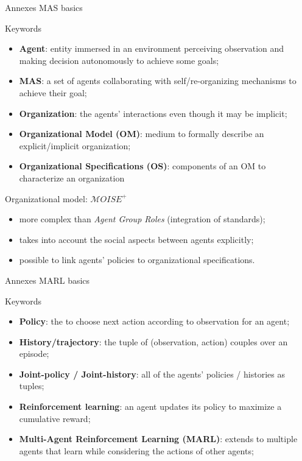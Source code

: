 \begin{frame}{Annexes}
    {MAS basics}

    \begin{block}{Keywords}
        \begin{itemize}
            \item \textbf{Agent}: entity immersed in an environment perceiving observation and making decision autonomously to achieve some goals;
            \item \textbf{MAS}: a set of agents collaborating with self/re-organizing mechanisms to achieve their goal;
            \item \textbf{Organization}: the agents' interactions even though it may be implicit;
            \item \textbf{Organizational Model (OM)}: medium to formally describe an explicit/implicit organization;
            \item \textbf{Organizational Specifications (OS)}: components of an OM to characterize an organization
        \end{itemize}
    \end{block}

    \begin{block}{Organizational model: $\mathcal{M}OISE^+$}
        \begin{itemize}
            \item more complex than \emph{Agent Group Roles} (integration of standards);
            \item takes into account the social aspects between agents explicitly;
            \item possible to link agents' policies to organizational specifications.
        \end{itemize}
    \end{block}

\end{frame}

\begin{frame}{Annexes}
    {MARL basics}

    \begin{block}{Keywords}
        \begin{itemize}
            \item \textbf{Policy}: the  to choose next action according to observation for an agent;
            \item \textbf{History/trajectory}: the tuple of (observation, action) couples over an episode;
            \item \textbf{Joint-policy / Joint-history}: all of the agents' policies / histories as tuples;
            \item \textbf{Reinforcement learning}: an agent updates its policy to maximize a cumulative reward;
            \item \textbf{Multi-Agent Reinforcement Learning (MARL)}: extends to multiple agents that learn while considering the actions of other agents;
        \end{itemize}
    \end{block}

\end{frame}


